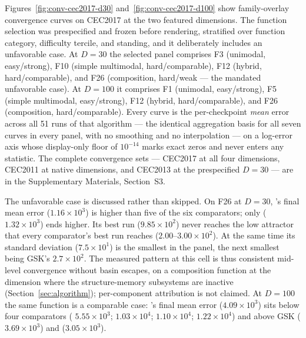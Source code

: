 Figures~\ref{fig:conv-cec2017-d30} and~\ref{fig:conv-cec2017-d100}
show family-overlay convergence curves on CEC2017 at the two featured
dimensions. The function selection was prespecified and frozen
before rendering, stratified over function category, difficulty tercile, and
\dtgsk{} standing, and it deliberately includes an unfavorable case.
At $D = 30$ the selected panel comprises F3 (unimodal, easy/strong),
F10 (simple multimodal, hard/comparable), F12 (hybrid, hard/comparable),
and F26 (composition, hard/weak --- the mandated unfavorable case).
At $D = 100$ it comprises F1 (unimodal, easy/strong),
F5 (simple multimodal, easy/strong), F12 (hybrid, hard/comparable),
and F26 (composition, hard/comparable).
Every curve is the per-checkpoint \emph{mean} error across all 51
runs of that algorithm --- the identical aggregation basis for all
seven curves in every panel, with no smoothing and no
interpolation --- on a log-error axis whose display-only floor of
$10^{-14}$ marks exact zeros and never enters any statistic. The
complete convergence sets --- CEC2017 at all four dimensions, CEC2011
at native dimensions, and CEC2013 at the prespecified $D = 30$ --- are
in the Supplementary Materials, Section~S3.

The unfavorable case is discussed rather than skipped. On F26 at
$D = 30$, \dtgsk{}'s final mean error ($1.16 \times 10^{3}$) is
higher than five of the six comparators; only \atmals{}
($1.32 \times 10^{3}$) ends higher. Its best run
($9.85 \times 10^{2}$) never reaches the low attractor that every
comparator's best run reaches ($2.00$--$3.00 \times 10^{2}$). At the
same time its standard deviation ($7.5 \times 10^{1}$) is the
smallest in the panel, the next smallest being GSK's
$2.7 \times 10^{2}$.
The measured pattern at this cell is thus consistent mid-level
convergence without basin escapes, on a composition function at the
dimension where the structure-memory subsystems are inactive
(Section~\ref{sec:algorithm}); per-component attribution is not
claimed.
At $D = 100$ the same function is a comparable case: \dtgsk{}'s
final mean error ($4.09 \times 10^{3}$) sits below four comparators
(\atmals{} $5.55 \times 10^{3}$; \fdbagsk{} $1.03 \times 10^{4}$;
\agsk{} $1.10 \times 10^{4}$; \apgsk{} $1.22 \times 10^{4}$) and
above GSK ($3.69 \times 10^{3}$) and \egsk{}
($3.05 \times 10^{3}$).

